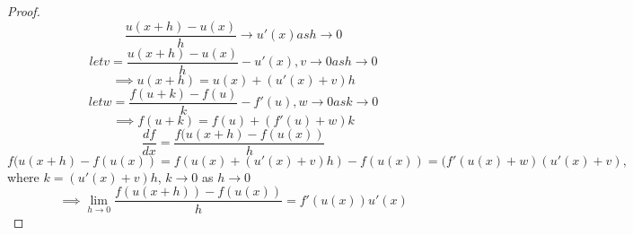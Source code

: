\documentclass[a4paper,10pt]{article}
\begin{document}
\begin{proof}
	\[ \frac{u(x+h) - u(x)}{h} \to u'(x) as h \to 0 \]
	\[ let v = \frac{u(x+h) - u(x)}{h} - u'(x), v \to 0 as h \to 0 \]
	\[ \implies u(x+h) = u(x) + (u'(x) + v)h \]
	\[ let w = \frac{f(u+k) - f(u)}{k} - f'(u), w \to 0 as k \to 0 \]
	\[ \implies f(u+k) = f(u) + (f'(u) + w)k \]
	\[ \frac{df}{dx} = \frac{f(u(x+h) - f(u(x))}{h} \]
	\[ f(u(x+h) - f(u(x))= f(u(x) + (u'(x)+v)h) - f(u(x))  = (f'(u(x) +
	w)(u'(x) + v), \]
	where $k = (u'(x)+v)h$, $k \to 0$ as $h \to 0$
	\[ \implies \lim_{h \to 0} \frac{f(u(x+h)) - f(u(x))}{h} =
	f'(u(x))u'(x) \]

\end{proof}
\end{document}
